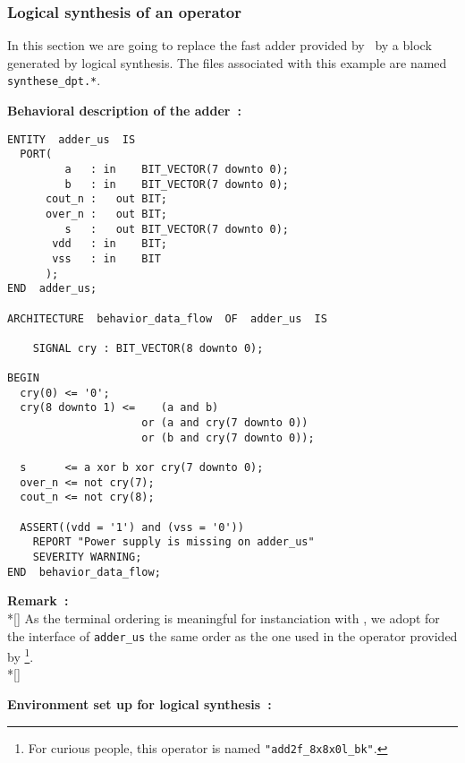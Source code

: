      \subsubsection{Logical synthesis of an operator}
     \begin{minipage}[t]{\textwidth}
       \forceindent
         In this section we are going to replace the fast adder provided
       by \DPADDIIF\ by a block generated by logical synthesis. The files
       associated with this example are named {\tt synthese\_dpt.*}.
       \bigskip
     \end{minipage}
     \begin{minipage}[t]{\textwidth}
     {\bf Behavioral description of the adder~:}
       { \tt \begin{verbatim}
ENTITY  adder_us  IS
  PORT(
         a   : in    BIT_VECTOR(7 downto 0);
         b   : in    BIT_VECTOR(7 downto 0);
      cout_n :   out BIT;
      over_n :   out BIT;
         s   :   out BIT_VECTOR(7 downto 0);
       vdd   : in    BIT;
       vss   : in    BIT
      );
END  adder_us;

ARCHITECTURE  behavior_data_flow  OF  adder_us  IS

	SIGNAL cry : BIT_VECTOR(8 downto 0);

BEGIN
  cry(0) <= '0';
  cry(8 downto 1) <=    (a and b)
                     or (a and cry(7 downto 0))
                     or (b and cry(7 downto 0));

  s      <= a xor b xor cry(7 downto 0);
  over_n <= not cry(7);
  cout_n <= not cry(8);

  ASSERT((vdd = '1') and (vss = '0'))
    REPORT "Power supply is missing on adder_us"
    SEVERITY WARNING;
END  behavior_data_flow;
       \end{verbatim} \rm }
       \bigskip
     \end{minipage}
     \noindent
     {\bf Remark~:}\\*[\bigskipamount]
     \nopagebreak
     \indent
       As the terminal ordering is meaningful for instanciation with
     \DPIMPORT, we adopt for the interface of {\tt adder\_us} the same
     order as the one used in the operator provided by \DPADDIIF
     \footnote{
       For curious people, this operator is named {\tt "add2f\_8x8x0l\_bk"}.
     }.\\*[\bigskipamount]
     \begin{minipage}[t]{\textwidth}
       {\bf Environment set up for logical synthesis~:}\\
       \forceindent
     \bigskip
     \end{minipage}
